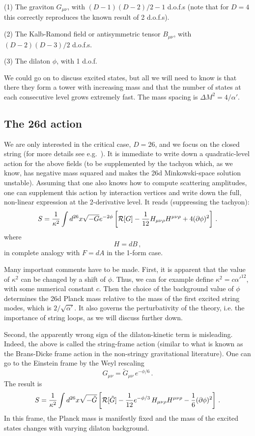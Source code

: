 \documentclass[12pt]{article}
\newcommand{\be}{\begin{equation}}
\newcommand{\ee}{\end{equation}}
\numberwithin{equation}{section}
\begin{document}
\noindent
(1) The graviton $G_{\mu\nu}$, with $(D-1)(D-2)/2-1$ d.o.f.s (note that for $D=4$ this correctly reproduces the known result of 2 d.o.f.s).

\noindent
(2) The Kalb-Ramond field or antisymmetric tensor $B_{\mu\nu}$, with $(D-2)(D-3)/2$ d.o.f.s.

\noindent
(3) The dilaton $\phi$, with 1 d.o.f.

We could go on to discuss excited states, but all we will need to know is that there they form a tower with increasing mass and that the number of states at each consecutive level grows extremely fast. The mass spacing is $\Delta M^2=4/\alpha'$. 





\subsection{The 26d action}

We are only interested in the critical case, $D=26$, and we focus on the closed string (for more details see e.g.~\cite{Polchinski:1998rq}). It is immediate to write down a quadratic-level action for the above fields (to be supplemented by the tachyon which, as we know, has negative mass squared and makes the 26d Minkowski-space solution unstable). Assuming that one also knows how to compute scattering amplitudes, one can supplement this action by interaction vertices and write down the full, non-linear expression at the 2-derivative level. It reads (suppressing the tachyon):
\be
S=\frac{1}{\kappa^2}\int d^{26}x\sqrt{-G}e^{-2\phi}\left[{\cal R}[G]-\frac{1}{12}H_{\mu\nu\rho}H^{\mu\nu\rho}+4(\partial\phi)^2\right]\,.
\label{10da}
\ee
where
\be
H=dB\,,
\ee
in complete analogy with $F=dA$ in the 1-form case.

Many important comments have to be made. First, it is apparent that the value of $\kappa^2$ can be changed by a shift of $\phi$. Thus, we can for example define $\kappa^2=c\alpha'^{12}$, with some numerical constant $c$. Then the choice of the background value of $\phi$ determines the 26d Planck mass relative to the mass of the first excited string modes, which is $2/\sqrt{\alpha'}$. 
It also governs the perturbativity of the theory, i.e. the importance of string loops, as we will discuss further down.

Second, the apparently wrong sign of the dilaton-kinetic term is misleading. Indeed, the above is called the string-frame action (similar to what is known as the Brans-Dicke frame action in the non-stringy gravitational literature). One can go to the Einstein frame by the Weyl rescaling
\be
G_{\mu\nu}=\tilde{G}_{\mu\nu}\,e^{-\phi/6}\,.
\ee
The result is
\be
S=\frac{1}{\kappa^2}\int d^{26}x\sqrt{-\tilde{G}}\left[{\cal R}[\tilde{G}]-\frac{1}{12}e^{-\phi/3}\,H_{\mu\nu\rho}H^{\mu\nu\rho}-
\frac{1}{6}(\partial\phi)^2\right]\,.
\ee
In this frame, the Planck mass is manifestly fixed and the mass of the excited states changes with varying dilaton background. 
\end{document}
